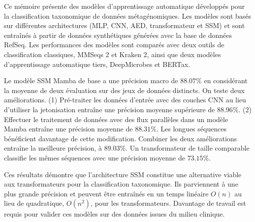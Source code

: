 \begin{conclusion}
\label{chapitre:conclusion}
Ce mémoire présente des modèles d'apprentissage automatique développés pour la classification
taxonomique de données métagénomiques. Les modèles sont basés sur différentes architectures (MLP,
CNN, AED, transformateur et SSM) et sont entraînés à partir de données synthétiques générées avec la
base de données RefSeq. Les performances des modèles sont comparés avec deux outils de
classification classiques, MMSeqs 2 et Kraken 2, ainsi que deux modèles d'apprentissage automatique
tiers, DeepMicrobes et BERTax.

Le modèle SSM Mamba de base a une précision macro de $88.07\%$ en considérant la moyenne de deux
évaluation sur des jeux de données distincts. On teste deux améliorations. (1) Pré-traiter les
données d'entrée avec des couches CNN au lieu d'utiliser la jetonisation entraîne une précision
moyenne supérieure de $88.96\%$. (2) Effectuer le traitement de données avec des flux parallèles
dans un modèle Mamba entraîne une précision moyenne de $88.31\%$. Les longues séquences bénéficient
davantage de cette modification. Combiner les deux améliorations entraîne la meilleure précision, à
$89.03\%$. Un transformateur de taille comparable classifie les mêmes séquences avec une précision
moyenne de $73.15\%$.

Ces résultats démontre que l'architecture SSM constitue une alternative viable aux transformateurs
pour la classification taxonomique. Ils parviennent à une plus grande précision et peuvent être
entraînés en un temps linéaire $O(n)$ au lieu de quadratique, $O(n^2)$, pour les transformateurs.
Davantage de travail est requis pour valider ces modèles sur des données issues du milieu clinique.

\end{conclusion}